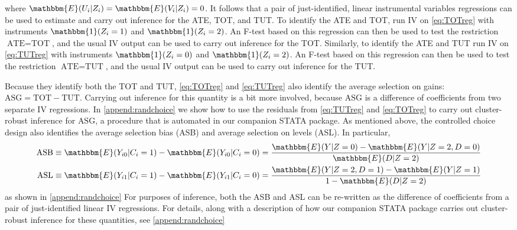 \documentclass[oneside,11pt]{article}
\begin{document}
where $\mathbbm{E}(U_i|Z_i) = \mathbbm{E}(V_i|Z_i) = 0$.
It follows that a pair of just-identified, linear instrumental variables regressions can be used to estimate and carry out inference for the ATE, TOT, and TUT. To identify the ATE and TOT, run IV on \eqref{eq:TOTreg} with instruments $\mathbbm{1}(Z_i = 1)$ and $\mathbbm{1}(Z_i=2)$. An F-test based on this regression can then be used to test the restriction $\text{ATE} = \text{TOT}$, and the usual IV output can be used to carry out inference for the TOT. Similarly, to identify the ATE and TUT run IV on \ref{eq:TUTreg} with instruments $\mathbbm{1}(Z_i = 0)$ and $\mathbbm{1}(Z_i = 2)$. An F-test based on this regression can then be used to test the restriction $\text{ATE} = \text{TUT}$, and the usual IV output can be used to carry out inference for the TUT. 

Because they identify both the TOT and TUT, \eqref{eq:TOTreg} and \eqref{eq:TUTreg} also identify the average selection on gains: $\text{ASG} = \text{TOT} - \text{TUT}$.
Carrying out inference for this quantity is a bit more involved, because $\text{ASG}$ is a difference of coefficients from two separate IV regressions. 
In \ref{append:randchoice} we show how to use the residuals from \eqref{eq:TUTreg} and \eqref{eq:TOTreg} to carry out cluster-robust inference for $\text{ASG}$, a procedure that is automated in our companion STATA package.
As mentioned above, the controlled choice design also identifies the average selection bias (ASB) and average selection on levels (ASL).
In particular,
\begin{align}
\label{eq:ASB}
    \text{ASB} &\equiv \mathbbm{E}(Y_{i0}|C_i=1) - \mathbbm{E}(Y_{i0}|C_i = 0) = \frac{\mathbbm{E}(Y|Z=0) - \mathbbm{E}(Y|Z=2,D=0)}{\mathbbm{E}(D|Z=2)}\\
    \label{eq:ASL}
    \text{ASL} &\equiv \mathbbm{E}(Y_{i1}|C_i = 1) - \mathbbm{E}(Y_{i1}|C_i=0) = \frac{\mathbbm{E}(Y|Z=2,D=1) - \mathbbm{E}(Y|Z=1)}{1 - \mathbbm{E}(D|Z=2)}
\end{align}
as shown in \ref{append:randchoice}
For purposes of inference, both the ASB and ASL can be re-written as the difference of coefficients from a pair of just-identified linear IV regressions.
For details, along with a description of how our companion STATA package carries out cluster-robust inference for these quantities, see \ref{append:randchoice}

\end{document}

